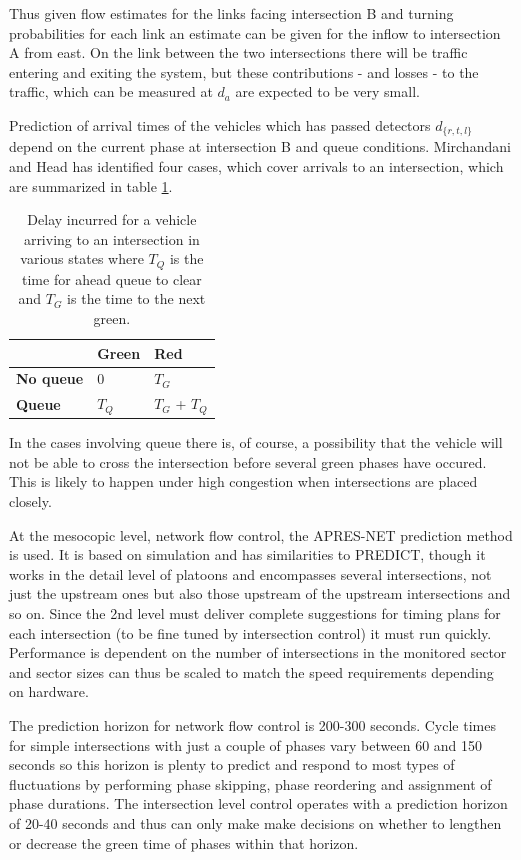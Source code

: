 Thus given flow estimates for the links facing intersection B and turning probabilities for each link an estimate can be given for the inflow to intersection A from east. On the link between the two intersections there will be traffic entering and exiting the system, but these contributions - and losses - to the traffic, which can be measured at $d_a$ are expected to be very small.

Prediction of arrival times of the vehicles which has passed detectors $d_{\lbrace r,t,l \rbrace}$ depend on the current phase at intersection B and queue conditions. Mirchandani and Head has identified four cases, which cover arrivals to an intersection, which are summarized in table \ref{tbl:delaycases}.

\begin{table}[!ht]
\begin{center}
\begin{tabular}{l|ll}
 & \textbf{Green} & \textbf{Red} \\ \hline
\textbf{No queue} & 0 & $T_G$ \\
\textbf{Queue} & $T_Q$ & $T_G$ + $T_Q$
\end{tabular}
\end{center}
\caption{Delay incurred for a vehicle arriving to an intersection in various states where $T_Q$ is the time for ahead queue to clear and $T_G$ is the time to the next green.}
\label{tbl:delaycases}
\end{table}

In the cases involving queue there is, of course, a possibility that the vehicle will not be able to cross the intersection before several green phases have occured. This is likely to happen under high congestion when intersections are placed closely.

At the mesocopic level, network flow control, the APRES-NET prediction method is used. It is based on simulation and has similarities to PREDICT, though it works in the detail level of platoons and encompasses several intersections, not just the upstream ones but also those upstream of the upstream intersections and so on. Since the 2nd level must deliver complete suggestions for timing plans for each intersection (to be fine tuned by intersection control) it must run quickly. Performance is dependent on the number of intersections in the monitored sector and sector sizes can thus be scaled to match the speed requirements depending on hardware.

The prediction horizon for network flow control is 200-300 seconds. Cycle times for simple intersections with just a couple of phases vary between 60 and 150 seconds so this horizon is plenty to predict and respond to most types of fluctuations by performing phase skipping, phase reordering and assignment of phase durations. The intersection level control operates with a prediction horizon of 20-40 seconds and thus can only make make decisions on whether to lengthen or decrease the green time of phases within that horizon.

